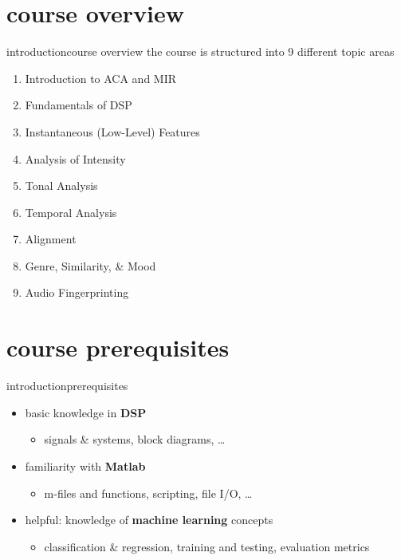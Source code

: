     \section[course overview]{course overview}
        \begin{frame}{introduction}{course overview}
            the course is structured into 9 different topic areas
            \begin{enumerate}
                \item   Introduction to ACA and MIR
                \item   Fundamentals of DSP
                \item   Instantaneous (Low-Level) Features
                \item   Analysis of Intensity
                \item   Tonal Analysis
                \item   Temporal Analysis
                \bigskip
                \item   Alignment
                \item   Genre, Similarity, \& Mood
                \item   Audio Fingerprinting
            \end{enumerate}
        \end{frame}
        
    \section[course prerequisites]{course prerequisites}
        \begin{frame}{introduction}{prerequisites}
            \begin{itemize}
                \item   basic knowledge in \textbf{DSP}
                    \begin{itemize}
                        \item signals \& systems, block diagrams, \ldots
                    \end{itemize}
                \bigskip
                \item	familiarity with \textbf{Matlab} 
                    \begin{itemize}
                        \item   m-files and functions, scripting, file I/O, \ldots
                    \end{itemize}
                \bigskip
                \item	helpful: knowledge of \textbf{machine learning} concepts
                    \begin{itemize}
                        \item   classification \& regression, training and testing, evaluation metrics
                    \end{itemize}
            \end{itemize}
        \end{frame}

